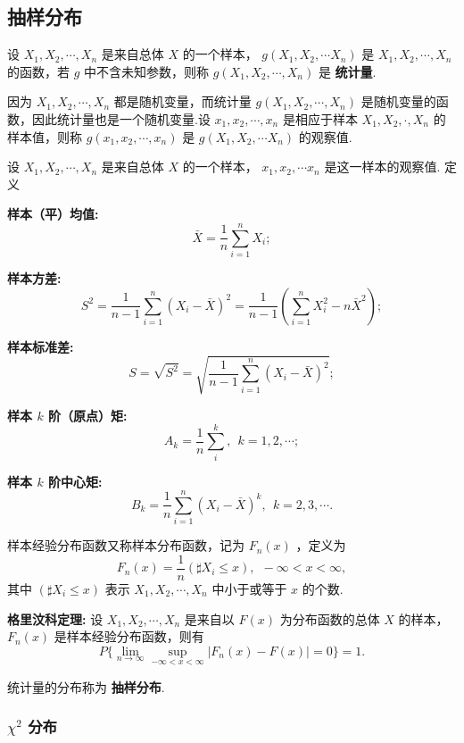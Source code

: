 \documentclass[UTF8,10pt]{ctexart}
\begin{document}
	\subsection{抽样分布}
	
	设 $ X_{1},X_{2}, \cdots ,X_{n} $ 是来自总体 $ X $ 的一个样本， $ g(X_{1},X_{2}, \cdots X_{n}) $ 是 $ X_{1},X_{2}, \cdots ,X_{n} $ 的函数，若 $ g $ 中不含未知参数，则称 $ g(X_{1},X_{2}, \cdots ,X_{n}) $ 是 \textbf{统计量}.
	
	因为 $ X_{1},X_{2}, \cdots ,X_{n} $ 都是随机变量，而统计量 $ g(X_{1},X_{2}, \cdots ,X_{n}) $ 是随机变量的函数，因此统计量也是一个随机变量.设 $ x_{1},x_{2}, \cdots ,x_{n} $ 是相应于样本 $ X_{1},X_{2}, \cdot ,X_{n} $ 的样本值，则称 $ g(x_{1},x_{2}, \cdots ,x_{n}) $ 是 $ g(X_{1},X_{2}, \cdots X_{n}) $ 的观察值.
	
	设 $ X_{1},X_{2}, \cdots ,X_{n} $ 是来自总体 $ X $ 的一个样本， $ x_{1},x_{2}, \cdots x_{n} $ 是这一样本的观察值. 定义
	
	\textbf{样本（平）均值:} $$ \bar{X}= \frac{1}{n} \sum\limits_{i=1}^{n}X_{i}; $$
	
	\textbf{样本方差:} $$ S^{2}= \frac{1}{n-1} \sum\limits_{i=1}^{n}(X_{i}- \bar{X})^{2}= \frac{1}{n-1}( \sum\limits_{i=1}^{n}X_{i}^{2}-n \bar{X} ^{2} ) ; $$
	
	\textbf{样本标准差:} $$ S = \sqrt{S^{2}}= \sqrt{ \frac{1}{n-1} \sum\limits_{i=1}^{n}(X_{i}- \bar{X} )^{2} } ; $$
	
	\textbf{样本 $ k $ 阶（原点）矩:} $$ A_{k}= \frac{1}{n} \sum\limits_{i}^{k},\ \ k=1,2, \cdots ; $$
	
	\textbf{样本 $ k $ 阶中心矩:} $$ B_{k}= \frac{1}{n} \sum\limits_{i=1}^{n}(X_{i}- \bar{X} )^{k},\ \ k=2,3, \cdots . $$
	
	样本经验分布函数又称样本分布函数，记为 $ F_{n}(x) $ ，定义为 $$ F_{n}(x)= \frac{1}{n} ( \sharp X_{i} \le x),\ \ - \infty <x< \infty, $$ 其中 $ ( \sharp X_{i} \le x) $ 表示 $ X_{1},X_{2}, \cdots ,X_{n} $ 中小于或等于 $ x $ 的个数.
	
	\textbf{格里汶科定理:} 设 $ X_{1},X_{2}, \cdots ,X_{n} $ 是来自以 $ F(x) $ 为分布函数的总体 $ X $ 的样本， $ F_{n}(x) $ 是样本经验分布函数，则有 $$ P\{ \lim\limits_{n \to \infty} \sup\limits_{- \infty <x< \infty }|F_{n}(x)-F(x)|=0 \}=1. $$
	
	统计量的分布称为 \textbf{抽样分布}.
	
	\subsubsection{ $ \chi ^{2} $ 分布 }
	
\end{document}

